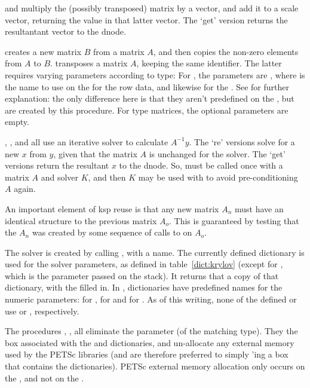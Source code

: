  and  multiply the (possibly
transposed) matrix by a vector, and add it to a scale vector,
returning the value in that latter vector. The `get' version returns
the resultantant vector to the dnode.

 creates a new matrix $B$ from a matrix $A$, and then
copies the non-zero elements from $A$ to $B$. 
transposes a matrix $A$, keeping the same identifier. The latter
requires varying parameters according to type: For ,
the parameters are  , where
 is the name to use on the  for
the row data, and likewise for the . See
 for further explanation: the only difference
here is that they aren't predefined on the , but
are created by this procedure. For  type matrices,
the optional parameters are empty.

, ,  and
 all use an iterative solver to calculate
$A^{-1}y$. The `re' versions solve for a new $x$ from $y$, given that
the matrix $A$ is unchanged for the solver. The `get' versions return
the resultant $x$ to the dnode. So,  must be called
once with a matrix $A$ and solver $K$, and then $K$ may be used with
 to avoid pre-conditioning $A$ again.

An important element of ksp reuse is that any new matrix $A_n$ must
have an identical structure to the previous matrix $A_o$. This is
guaranteed by testing that the $A_n$ was created by some sequence of
calls to  on $A_o$.

The solver is created by calling , with a
 name. The currently defined 
dictionary is used for the solver parameters, as defined in
table~\ref{dict:krylov} (except for , which is the
parameter passed on the stack). It returns that a copy of that
dictionary, with the  filled in. In ,
dictionaries have predefined names for the numeric parameters:
 for ,  for
 and  for
. As of this writing, none of the defined
 or  use  or
, respectively.

The procedures , ,
 all eliminate the parameter (of the matching
type). They  the box associated with the  and
 dictionaries, and un-allocate any external memory used
by the PETSc libraries (and are therefore preferred to simply
'ing a box that contains the dictionaries). PETSc external
memory allocation only occurs on the , and not on
the .

